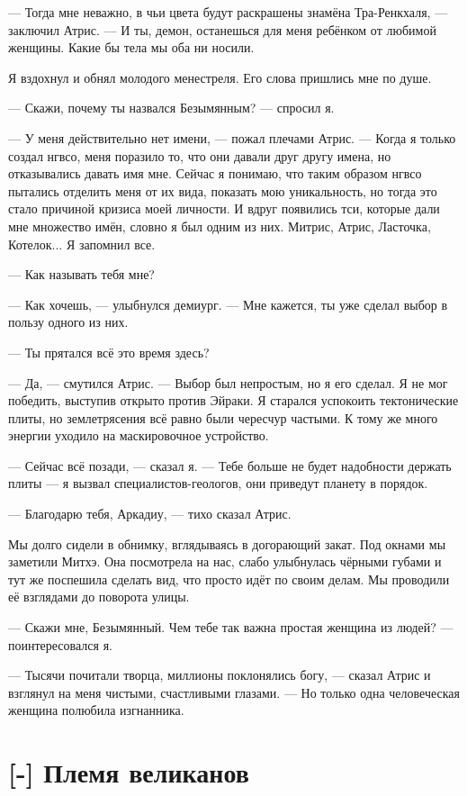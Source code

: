 --- Тогда мне неважно, в чьи цвета будут раскрашены знамёна Тра-Ренкхаля, --- заключил Атрис.
--- И ты, демон, останешься для меня ребёнком от любимой женщины.
Какие бы тела мы оба ни носили.

Я вздохнул и обнял молодого менестреля.
Его слова пришлись мне по душе.

--- Скажи, почему ты назвался Безымянным? --- спросил я.

--- У меня действительно нет имени, --- пожал плечами Атрис.
--- Когда я только создал нгвсо, меня поразило то, что они давали друг другу имена, но отказывались давать имя мне.
Сейчас я понимаю, что таким образом нгвсо пытались отделить меня от их вида, показать мою уникальность, но тогда это стало причиной кризиса моей личности.
И вдруг появились тси, которые дали мне множество имён, словно я был одним из них.
Митрис, Атрис, Ласточка, Котелок...
Я запомнил все.

--- Как называть тебя мне?

--- Как хочешь, --- улыбнулся демиург.
--- Мне кажется, ты уже сделал выбор в пользу одного из них.

--- Ты прятался всё это время здесь?

--- Да, --- смутился Атрис.
--- Выбор был непростым, но я его сделал.
Я не мог победить, выступив открыто против Эйраки.
Я старался успокоить тектонические плиты, но землетрясения всё равно были чересчур частыми.
К тому же много энергии уходило на маскировочное устройство.

--- Сейчас всё позади, --- сказал я.
--- Тебе больше не будет надобности держать плиты --- я вызвал специалистов-геологов, они приведут планету в порядок.

--- Благодарю тебя, Аркадиу, --- тихо сказал Атрис.

Мы долго сидели в обнимку, вглядываясь в догорающий закат.
Под окнами мы заметили Митхэ.
Она посмотрела на нас, слабо улыбнулась чёрными губами и тут же поспешила сделать вид, что просто идёт по своим делам.
Мы проводили её взглядами до поворота улицы.

--- Скажи мне, Безымянный.
Чем тебе так важна простая женщина из людей? --- поинтересовался я.

--- Тысячи почитали творца, миллионы поклонялись богу, --- сказал Атрис и взглянул на меня чистыми, счастливыми глазами.
--- Но только одна человеческая женщина полюбила изгнанника.

\section{[-] Племя великанов}

